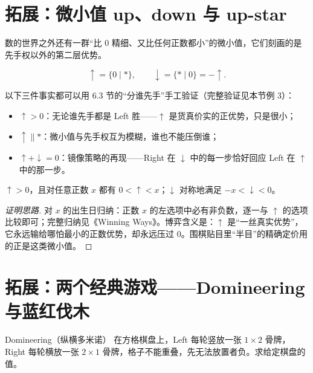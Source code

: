 \section{拓展：微小值 up、down 与 up-star}
数的世界之外还有一群“比 $0$ 精细、又比任何正数都小”的微小值，它们刻画的是先手权以外的第二层优势。

\begin{definition}[up 与 down]
\[
 \uparrow=\{0\mid \ast\},\qquad \downarrow=\{\ast\mid 0\}=-\uparrow .
\]
\end{definition}

以下三件事实都可以用 6.3 节的“分谁先手”手工验证（完整验证见本节例 3）：
\begin{itemize}
\item $\uparrow>0$：无论谁先手都是 Left 胜——$\uparrow$ 是货真价实的正优势，只是很小；
\item $\uparrow\parallel\ast$：微小值与先手权互为模糊，谁也不能压倒谁；
\item $\uparrow+\downarrow=0$：镜像策略的再现——Right 在 $\downarrow$ 中的每一步恰好回应 Left 在 $\uparrow$ 中的那一步。
\end{itemize}

\begin{theorem}[微小性]\label{thm:up}
$\uparrow>0$，且对任意正数 $x$ 都有 $0<\uparrow<x$；$\downarrow$ 对称地满足 $-x<\downarrow<0$。
\end{theorem}
\begin{proof}[证明思路]
对 $x$ 的出生日归纳：正数 $x$ 的左选项中必有非负数，逐一与 $\uparrow$ 的选项比较即可；完整归纳见《Winning Ways》。博弈含义是：$\uparrow$ 是“一丝真实优势”，它永远输给哪怕最小的正数优势，却永远压过 $0$。围棋贴目里“半目”的精确定价用的正是这类微小值。
\end{proof}

\section{拓展：两个经典游戏——Domineering 与蓝红伐木}
\begin{problem}{Domineering（纵横多米诺）}
在方格棋盘上，Left 每轮竖放一张 $1\times 2$ 骨牌，Right 每轮横放一张 $2\times 1$ 骨牌，格子不能重叠，先无法放置者负。求给定棋盘的值。
\end{problem}

